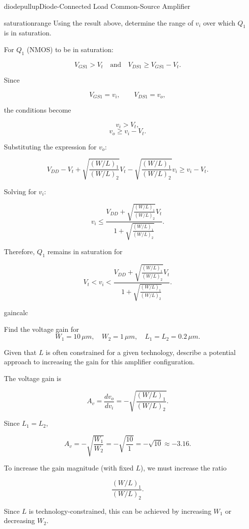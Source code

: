 \begin{mainquestion}{diodepullup}{Diode-Connected Load Common-Source Amplifier}
\begin{partquestion}{saturationrange}
{Using the result above, determine the range of $v_i$ over which $Q_1$ is in saturation.}

\begin{answer}
For $Q_1$ (NMOS) to be in saturation:

\[
V_{GS1} > V_t
\quad \text{and} \quad
V_{DS1} \ge V_{GS1} - V_t.
\]

Since

\[
V_{GS1} = v_i, 
\qquad
V_{DS1} = v_o,
\]

the conditions become

\[
v_i > V_t,
\]
\[
v_o \ge v_i - V_t.
\]

Substituting the expression for $v_o$:

\[
V_{DD} - V_t
+ \sqrt{\frac{(W/L)_1}{(W/L)_2}} V_t
- \sqrt{\frac{(W/L)_1}{(W/L)_2}} v_i
\ge
v_i - V_t.
\]

Solving for $v_i$:

\[
v_i
\le
\frac{
V_{DD}
+
\sqrt{\frac{(W/L)_1}{(W/L)_2}} V_t
}{
1 + \sqrt{\frac{(W/L)_1}{(W/L)_2}}
}.
\]

Therefore, $Q_1$ remains in saturation for

\[
\boxed{
V_t
<
v_i
<
\frac{
V_{DD}
+
\sqrt{\frac{(W/L)_1}{(W/L)_2}} V_t
}{
1 + \sqrt{\frac{(W/L)_1}{(W/L)_2}}
}.
}
\]
\end{answer}

\pagebreak
\end{partquestion}

\begin{partquestion}{gaincalc}
{Find the voltage gain for 
\[
W_1 = 10\,\mu m, \quad 
W_2 = 1\,\mu m, \quad 
L_1 = L_2 = 0.2\,\mu m.
\]

Given that $L$ is often constrained for a given technology, describe a potential approach to increasing the gain for this amplifier configuration.}

\begin{answer}
The voltage gain is

\[
A_v = \frac{d v_o}{d v_i}
=
- \sqrt{\frac{(W/L)_1}{(W/L)_2}}.
\]

Since $L_1 = L_2$,

\[
A_v
=
- \sqrt{\frac{W_1}{W_2}}
=
- \sqrt{\frac{10}{1}}
=
- \sqrt{10}
\approx -3.16.
\]

To increase the gain magnitude (with fixed $L$), we must increase the ratio

\[
\frac{(W/L)_1}{(W/L)_2}.
\]

Since $L$ is technology-constrained, this can be achieved by increasing $W_1$ or decreasing $W_2$.
\end{answer}

\end{partquestion}

\end{mainquestion}
